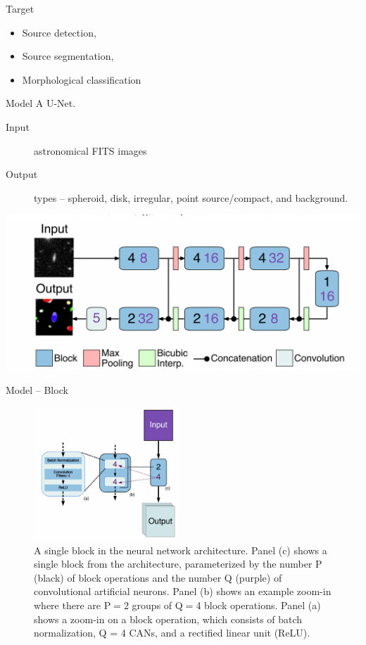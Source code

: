 \documentclass[aspectratio=1610,xcolor={dvipsnames},hyperref={colorlinks,unicode,linkcolor=violet,anchorcolor=blueviolet,citecolor=YellowOrange,filecolor=black,urlcolor=Aquamarine}]{beamer}
\begin{document}
\begin{frame}[label={sec:org12b97c1}]{Target}
\begin{itemize}
\item Source detection,
\item Source segmentation,
\item Morphological classification
\end{itemize}
\end{frame}

\begin{frame}[label={sec:org205197a}]{Model}
A U-Net.
\begin{description}
\item[{Input}] astronomical FITS images
\item[{Output}] types -- spheroid, disk, irregular, point source/compact, and background.
\end{description}

\begin{center}
\includegraphics[width=.9\linewidth]{./p9.png}
\end{center}
\end{frame}

\begin{frame}[label={sec:org9c475be}]{Model -- Block}
\begin{figure}[htbp]
\centering
\includegraphics[height=5cm]{./p10.png}
\caption{A single block in the neural network architecture.  Panel (c) shows a single block from the architecture, parameterized by the number P (black) of block operations and the number Q (purple) of convolutional artificial neurons. Panel (b) shows an example zoom-in where there are P=2 groups of Q=4 block operations. Panel (a) shows a zoom-in on a block operation, which consists of batch normalization, Q = 4 CANs, and a rectified linear unit (ReLU).}
\end{figure}
\end{frame}
\end{document}
